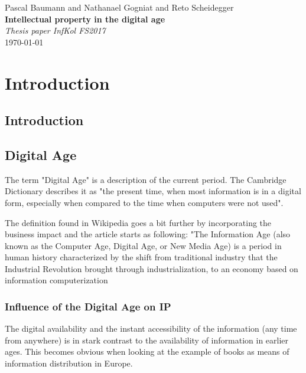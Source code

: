 \documentclass[a4paper]{report}
\newcommand*{\titleAP}{\begingroup %
	\centering
	\vspace*{\baselineskip} %
	
	{\Large Pascal Baumann} and {\Large Nathanael Gogniat} and {\Large Reto Scheidegger}\\[0.167\textheight] %
	
	{\Huge\bfseries Intellectual property in the digital age}\\[\baselineskip]
	
	{\Large \textit{Thesis paper InfKol FS2017}}\\
	\today
	
	\vspace*{3\baselineskip} %
	\endgroup}
\begin{document}
\titleAP

\begin{abstract}
	\blindtext
\end{abstract}
\newpage

\tableofcontents

\newpage

\chapter{Introduction}
\label{ch:Intro}

\section{Introduction}
\label{sec:Intro}

\section{Digital Age}
\label{sec:Digital age}
The term "Digital Age" is a description of the current period. The Cambridge Dictionary describes it as "the present time, when most information is in a digital form, especially when compared to the time when computers were not used". \parencite{CambridgeUniversityPress2014}

The definition found in Wikipedia goes a bit further by incorporating the business impact and the article starts as following: "The Information Age (also known as the Computer Age, Digital Age, or New Media Age) is a period in human history characterized by the shift from traditional industry that the Industrial Revolution brought through industrialization, to an economy based on information computerization \parencite{WikiInfoAge2017}

\subsection{Influence of the Digital Age on IP}
The digital availability and the instant accessibility of the information (any time from anywhere) is in stark contrast to the availability of information in earlier ages. This becomes obvious when looking at the example of books as means of information distribution in Europe.
\end{document}

